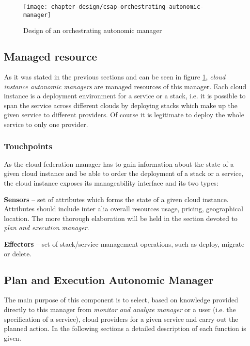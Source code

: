 \begin{figure}[!ht]
  \begin{center}
    \texttt{[image: chapter-design/csap-orchestrating-autonomic-manager]}
  \end{center}
  \caption{Design of an orchestrating autonomic manager}
  \label{img:orchestrating-autonomic-manager}
\end{figure}

\subsection{Managed resource}
As it was stated in the previous sections and can be seen in figure \ref{img:orchestrating-autonomic-manager}, \emph{cloud instance autonomic managers} are managed resources of this manager. Each cloud instance is a deployment environment for a service or a stack, i.e. it is possible to span the service across different clouds by deploying stacks which make up the given service to different providers. Of course it is legitimate to deploy the whole service to only one provider.
\subsubsection*{Touchpoints}
As the cloud federation manager has to gain information about the state of a given cloud instance and be able to order the deployment of a stack or a service, the cloud instance exposes its manageability interface and its two types:
\begin{asparaenum}
\item[\textbf{Sensors}] -- set of attributes which forms the state of a given cloud instance. Attributes should include inter alia overall resources usage, pricing, geographical location. The more thorough elaboration will be held in the section devoted to \emph{plan and execution manager}.
\item[\textbf{Effectors}] -- set of stack/service management operations, such as deploy, migrate or delete.
\end{asparaenum}

\subsection{Plan and Execution Autonomic Manager}
The main purpose of this component is to select, based on knowledge provided directly to this manager from \emph{monitor and analyze manager} or a user (i.e. the specification of a service), cloud providers for a given service and carry out the planned action. In the following sections a detailed description of each function is given.

